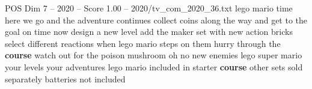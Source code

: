 \begin{textsample}{POS Dim 7 – 2020 – Score 1.00 – 2020/tv\_com\_2020\_36.txt}  \label{ex:f7_pos_088}
lego mario time here we go and the adventure continues collect coins along the way and get to the goal on time now design a new level add the maker set with new action bricks select different reactions when lego mario steps on them hurry through the \textbf{course} watch out for the poison mushroom oh no new enemies lego super mario your levels your adventures lego mario included in starter \textbf{course} other sets sold separately batteries not included

\end{textsample}
